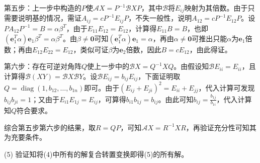 \documentclass[a4paper,UTF8,fontset=windows]{ctexart}
\DeclareMathOperator{\diag}{diag}
\begin{document}
\begin{enumerate}
第五步：上一步中构造的$P$使$\mathcal{A}X=P^{-1}\mathcal{B}XP$，其中$\mathcal{B}$将$E_{ij}$映射为其倍数。由于只需要说明基的情况，需证$A_{ij}=cP^{-1}E_{ij}P$，不失一般性，说明$A_{12}=cP^{-1}E_{12}P$。设$PA_{12}P^{-1}=B=\alpha\beta^T$，由于$E_{11}E_{12}=E_{12}$，计算得$E_{11}B=B$，也即$(\mathbf{e}_1^T\alpha)\mathbf{e}_1\beta^T=\alpha\beta^T$。由$\beta\ne\mathbf{0}$可知$(\mathbf{e}_1^T\alpha)\mathbf{e}_1=\alpha$，再由$\alpha\ne\mathbf{0}$可推出只能$\alpha$为$\mathbf{e}_1$倍数；再由$E_{12}E_{22}=E_{12}$，类似可证$\beta$为$\mathbf{e}_2$倍数，因此$B=cE_{12}$，由此得证。

第六步：存在可逆对角阵$Q$使上一步中的$\mathcal{B}X=Q^{-1}XQ$。由假设知$\mathcal{B}E_{ii}=E_{ii}$，且计算得$\mathcal{B}(XY)=\mathcal{B}X\mathcal{B}Y$。设$\mathcal{B}E_{ij}=b_{ij}E_{ij}$，下面证明取$Q=\diag(1,b_{12},\dots,b_{1n})$即可。由于$(E_{ij}+E_{ji})^2=E_{ii}+E_{jj}$，代入计算可发现$b_{ij}b_{ji}=1$；又由于$E_{i1}E_{1j}=E_{ij}$，可算得$b_{i1}b_{1j}=b_{ij}$。由此可知$b_{ij}=\frac{b_{1j}}{b_{1i}}$，代入计算知$Q$符合要求。

综合第五步第六步的结果，取$R=QP$，可知$\mathcal{A}X=R^{-1}XR$，再验证充分性可知其为充要条件。

(5) 验证知将(4)中所有的解复合转置变换即得(5)的所有解。
\end{enumerate}
\end{document}
